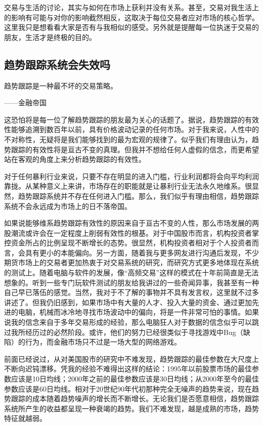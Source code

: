 交易与生活的讨论，其实与如何在市场上获利并没有关系。甚至，交易对我生活上的影响有可能与对你的影响截然相反，这取决于每位交易者应对市场的核心哲学。这里我只是想看看大家是否有与我相似的感受。另外就是提醒每一位执迷于交易的朋友，生活才是终极的目的。

\subsection{趋势跟踪系统会失效吗}

{\kaishu
趋势跟踪是一种最不坏的交易策略。

\hfill ——金融帝国
}

这恐怕将是每一位了解趋势跟踪的朋友最为关心的话题了。据说，趋势跟踪的有效性能够追溯到数百年以前，具有价格波动记录的任何市场。对于我来说，人性中的不对称性，无疑将是我们能够找到的最为宏观的规律了。似乎我们有理由认为，趋势跟踪的有效性将是亘古不变的真理。但我并不想给任何人虚假的信念，而更希望站在客观的角度上来分析趋势跟踪的有效性。

对于任何暴利行业来说，只要不存在明显的进入门槛，行业利润都将会向平均利润靠拢。从某种意义上来讲，市场存在的职能就是让暴利行业无法永久地维系。很显然，趋势跟踪系统并不存在任何进入门槛。那么，我们似乎有理由相信，趋势跟踪系统不会永远成为市场上的日不落帝国。

如果说能够维系趋势跟踪有效性的原因来自于亘古不变的人性，那么市场发展的两股潮流或许会在一定程度上削弱有效性的根基。对于中国股市而言，机构投资者掌控资金所占的比例呈现不断增长的态势。很显然，机构投资者相对于个人投资者而言，会具有更小的本能偏向。另一方面，随着我与更多网友进行沟通后发现，不少期货市场上的交易者更加热衷于对交易系统的研究，而研究方式更多地体现在系统的测试上。随着电脑与软件的发展，像“高频交易”这样的模式在十年前简直是无法想象的。听到一些专门玩软件测试的朋友给我讲过的一些奇闻异事，我甚至有一种自己早已落伍的感觉。当然，我对于不了解的事物并不具有发言权，这里就不过多讲述了。但我仍旧感到，如果市场中有大量的人才、投入大量的资金、通过更加先进的电脑，机械而冰冷地寻找市场波动中的偏向，将是一件非常可怕的事情。如果说我的信念来自于多年交易形成的经验，那么电脑狂人对于数据的信念似乎可以跳过我所经历过的必然阶段。或许，他们的努力已经很类似于寻找游戏中Bug（缺陷）的行为，而金融市场只不过是一场大型的网络游戏。

前面已经说过，从对美国股市的研究中不难发现，趋势跟踪的最佳参数在大尺度上不断向迟钝漂移。凭我的经验不难得出这样的结论：1995年以前股票市场的最佳参数应该是10日均线；2000年之前的最佳参数应该是30日均线；从2000年至今的最佳参数应该是60日均线。相对于20世纪90年代初那种完全无噪声的趋势来说，现在趋势跟踪的成本随着趋势噪声的增长而不断增长。无论我们是否愿意相信，趋势跟踪系统所产生的收益都呈现一种衰竭的趋势。我们不难发现，越是成熟的市场，趋势特征就越弱。

